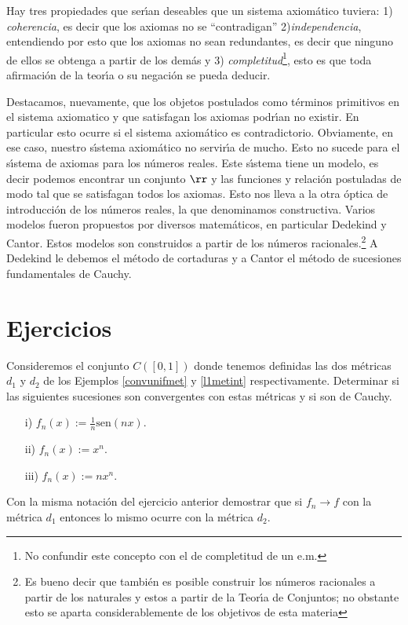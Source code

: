   Hay tres propiedades que
  ser\'{\i}an deseables que un sistema axiom\'atico tuviera: 1)
  \emph{coherencia}, es decir que los axiomas no se
  ``contradigan'' 2)\emph{independencia}, entendiendo por esto que
  los axiomas no sean redundantes, es decir que ninguno de ellos
  se obtenga a partir de los dem\'as y 3)
  \emph{completitud}\footnote{No confundir este concepto con el de
  completitud de un e.m.}, esto es que toda afirmaci\'on de la
  teor\'{\i}a o su negaci\'on se pueda deducir.

  Destacamos,
  nuevamente, que los objetos postulados como t\'erminos
  primitivos en el sistema axiomatico y que satisfagan los axiomas
  podr\'{\i}an no existir. En particular esto ocurre si el sistema
  axiom\'atico es contradictorio. Obviamente, en ese caso, nuestro
  s\'{\i}stema axiom\'atico no servir\'{\i}a de mucho. Esto no sucede para el
  s\'{\i}stema de axiomas para los n\'umeros reales. Este
  s\'{\i}stema tiene un modelo, es decir podemos encontrar un
  conjunto $\rr$ y las funciones y relaci\'on postuladas de modo
  tal que se satisfagan todos los axiomas. Esto nos lleva a la otra \'optica de
  introducci\'on de los n\'umeros reales, la que denominamos constructiva. Varios
  modelos fueron propuestos por diversos matem\'aticos, en
  particular Dedekind y Cantor. Estos modelos
  son construidos a partir de los n\'umeros racionales.\footnote{Es bueno
  decir que tambi\'en es posible construir los n\'umeros
  racionales a partir de los naturales y estos a partir de la
  Teor\'{\i}a de Conjuntos; no obstante esto se aparta
  considerablemente de los objetivos de esta materia} A Dedekind
  le debemos el m\'etodo de cortaduras y a Cantor el m\'etodo de
  sucesiones fundamentales de Cauchy.








\section{Ejercicios}

\begin{ejercicio}\label{ejer,testearconv} Consideremos el conjunto $C([0,1])$ donde
tenemos definidas las dos m\'etricas $d_1$ y $d_2$ de los Ejemplos
\vref{convunifmet} y \vref{l1metint} respectivamente. Determinar
si las siguientes sucesiones son convergentes con estas m\'etricas
y si son de Cauchy.
\begin{itemize}
    \item[i)] $f_n(x):=\frac1n\text{sen}(nx)$.
    \item[ii)] $f_n(x):=x^n$.
    \item[iii)]$f_n(x):=nx^n$.
\end{itemize}
\end{ejercicio}
\begin{ejercicio} Con la misma notaci\'on del ejercicio anterior
demostrar que si $f_n\to f$ con la m\'etrica  $d_1$ entonces lo
mismo ocurre con la m\'etrica $d_2$.
\end{ejercicio}

